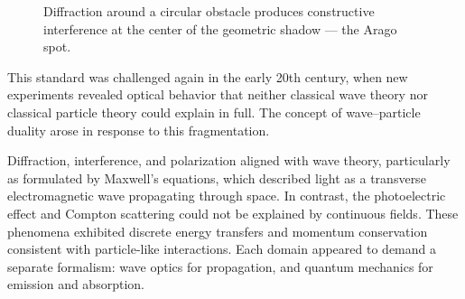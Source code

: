 \begin{figure}[h]
\centering
{}
\caption{Diffraction around a circular obstacle produces constructive interference at the center of the geometric shadow — the Arago spot.}
\end{figure}

This standard was challenged again in the early 20th century, when new experiments revealed optical behavior that neither classical wave theory nor classical particle theory could explain in full. The concept of wave–particle duality arose in response to this fragmentation.

Diffraction, interference, and polarization aligned with wave theory, particularly as formulated by Maxwell’s equations, which described light as a transverse electromagnetic wave propagating through space. In contrast, the photoelectric effect and Compton scattering could not be explained by continuous fields. These phenomena exhibited discrete energy transfers and momentum conservation consistent with particle-like interactions. Each domain appeared to demand a separate formalism: wave optics for propagation, and quantum mechanics for emission and absorption.

